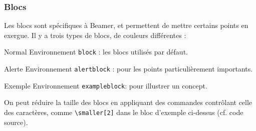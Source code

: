 \documentclass[10pt,    %
    french,             %
    xcolor=table,       %
    envcountsect,       %
    aspectratio=43      %
]{beamer}
\begin{document}
\begin{frame}
    \frametitle{Blocs}
    \label{frm:blocks}
    
    Les blocs sont spécifiques à Beamer, et permettent de mettre certains points en exergue. Il y a trois types de blocs, de couleurs différentes :

    \begin{block}{Normal}
        Environnement \texttt{block} : les blocs utilisés par défaut.
    \end{block}

    \begin{alertblock}{Alerte}
        Environnement \texttt{alertblock} : pour les points particulièrement importants.
    \end{alertblock}

    \begin{exampleblock}{\smaller[2] Exemple}
        \smaller[2] Environnement \texttt{exampleblock}: pour illustrer un concept.
    \end{exampleblock}
    
    On peut réduire la taille des blocs en appliquant des commandes contrôlant celle des caractères, comme \texttt{\textbackslash{}smaller[2]} dans le bloc d'exemple ci-dessus (cf. code source).
    
        
        
    
    
\end{frame}
\end{document}
